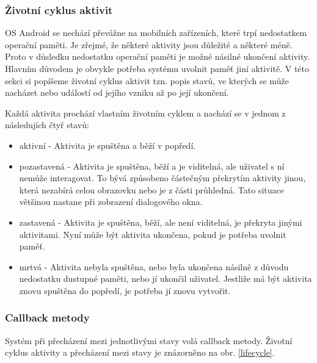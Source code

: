 \documentclass[12pt]{article}
\begin{document}
\subsubsection{Životní cyklus aktivit}
OS Android se nechází převážne na mobilních zařízeních, které trpí nedostatkem operační paměti. Je zřejmé, že některé aktivity jsou důležité a některé méně. Proto v důsledku nedostatku operační paměti je možné násilné ukončení aktivity. Hlavním důvodem je obvykle potřeba systému uvolnit paměť jiní aktivitě. V této sekci si popíšeme životní cyklus aktivit tzn. popis stavů, ve kterých se může nacházet nebo událostí od jejího vzniku až po její ukončení.

Každá aktivita prochází vlastním životním cyklem a nachází se v jednom z následujích čtyř stavů:
\begin{itemize}
\item aktivní - Aktivita je spuštěna a běží v popředí.
\item pozastavená - Aktivita je spuštěna, běží a je viditelná, ale uživatel s ní nemůže interagovat. To bývá způsobeno částečným překrytím aktivity jinou, která nezabírá celou obrazovku nebo je z části průhledná. Tato situace většinou nastane při zobrazení dialogového okna.
\item zastavená - Aktivita je spuštěna, běží, ale není viditelná, je překryta jinými aktivitami. Nyní může být aktivita ukončena, pokud je potřeba uvolnit paměť.
\item mrtvá - Aktivita nebyla spuštěna, nebo byla ukončena  násilně z důvodu nedostatku dustupné paměti, nebo jí ukončil uživatel. Jestliže má být aktivita znovu spuštěna do popředí, je potřeba jí znovu vytvořit.
\end{itemize}
\subsubsection{Callback metody}
Systém při přecházení mezi jednotlivými stavy volá callback metody. Životní cyklus aktivity a přecházení mezi stavy je znázorněno na obr. \ref{lifecycle}.
\end{document}
